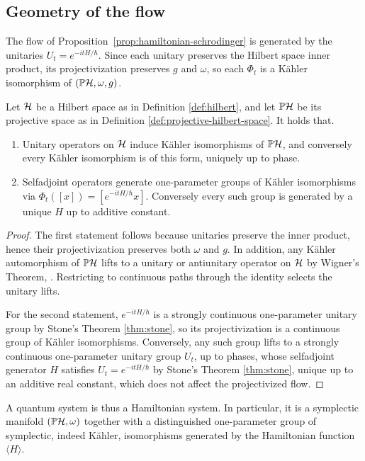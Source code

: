 \subsection*{Geometry of the flow}

The flow of Proposition~\ref{prop:hamiltonian-schrodinger} is generated
by the unitaries $U_t=e^{-itH/\hbar}$. Since each unitary preserves the
Hilbert space inner product, its projectivization preserves $g$ and
$\omega$, so each $\Phi_t$ is a Kähler isomorphism of $(\PH,\omega,g)$.

\begin{proposition}
	\label{prop:kahler-isomorphisms}
	Let $\H$ be a Hilbert space as in Definition \ref{def:hilbert}, and let $\PH$ be its projective space as in Definition \ref{def:projective-hilbert-space}. It holds that.
	\begin{enumerate}
		\item Unitary operators on $\H$ induce Kähler isomorphisms of $\PH$, and conversely every Kähler isomorphism is of this form, uniquely up to phase.
		\item Selfadjoint operators generate one-parameter groups of Kähler isomorphisms via $\Phi_t([x])=[e^{-itH/\hbar}x]$. Conversely every such group is generated by a unique $H$ up to additive constant.
	\end{enumerate}
\end{proposition}

\begin{proof}
	The first statement follows because unitaries preserve the inner product, hence their projectivization preserves both $\omega$ and $g$. In addition, any Kähler automorphism of $\PH$ lifts to a unitary or antiunitary operator on $\H$ by Wigner's Theorem, \cite[Theorem 12.11]{morettiSpectralTheoryQuantum}. Restricting to continuous paths through the identity selects the unitary lifts. 
	
	For the second statement, $e^{-itH/\hbar}$ is a strongly
	continuous one-parameter unitary group by Stone's Theorem \ref{thm:stone}, so its projectivization is a continuous group of Kähler isomorphisms. Conversely, any such group lifts to a strongly continuous one-parameter unitary group $U_t$, up to phases, whose selfadjoint generator $H$ satisfies $U_t=e^{-itH/\hbar}$ by Stone's Theorem \ref{thm:stone}, unique up to an additive real constant, which does not affect the projectivized flow.
\end{proof}

\begin{remark}
	A quantum system is thus a Hamiltonian system. In particular, it is a symplectic manifold $(\PH,\omega)$ together with a distinguished one-parameter group of symplectic, indeed Kähler, isomorphisms generated by the Hamiltonian function $\langle H\rangle$.
\end{remark}

